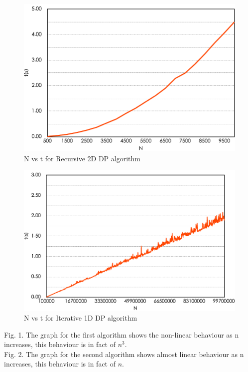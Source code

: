 \documentclass[conference]{IEEEtran}
\begin{document}
{\begin{figure}[ht]
\includegraphics[scale=0.6]{Recursive 2D DP.pdf}
\caption{N vs t for Recursive 2D DP algorithm}
\end{figure}


\begin{figure}[ht]
\includegraphics[scale=0.6]{Iterative 1D DP.pdf}
\caption{N vs t for Iterative 1D DP algorithm}
\end{figure}

Fig. 1. The graph for the first algorithm shows the non-linear behaviour as n increases, this behaviour is in fact of
$n^3$.\\

Fig. 2. The graph for the second algorithm shows almost linear behaviour as n increases, this behaviour is in fact of
$n$.\\

}
\end{document}
